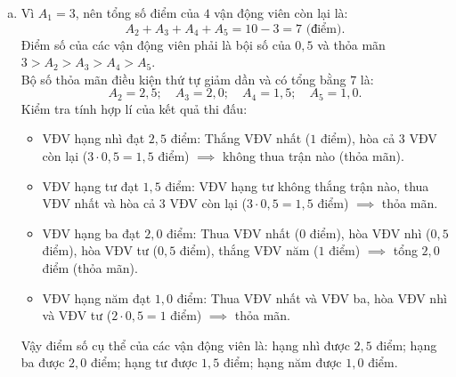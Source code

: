 \begin{bt}
{\begin{enumerate}[a)]
	Do đó vận động viên hạng nhất đạt được $3$ điểm ($3$ thắng, $1$ thua).
	\item Vì $A_1 = 3$, nên tổng số điểm của $4$ vận động viên còn lại là:
	$$A_2 + A_3 + A_4 + A_5 = 10 - 3 = 7\text{ (điểm)}.$$
	Điểm số của các vận động viên phải là bội số của $0{,}5$ và thỏa mãn $3 > A_2 > A_3 > A_4 > A_5$.\\
	Bộ số thỏa mãn điều kiện thứ tự giảm dần và có tổng bằng $7$ là:
	$$A_2 = 2{,}5; \quad A_3 = 2{,}0; \quad A_4 = 1{,}5; \quad A_5 = 1{,}0.$$
	Kiểm tra tính hợp lí của kết quả thi đấu:
	\begin{itemize}
		\item VĐV hạng nhì đạt $2{,}5$ điểm: Thắng VĐV nhất ($1$ điểm), hòa cả $3$ VĐV còn lại ($3 \cdot 0{,}5 = 1{,}5$ điểm) $\implies$ không thua trận nào (thỏa mãn).
		\item VĐV hạng tư đạt $1{,}5$ điểm: VĐV hạng tư không thắng trận nào, thua VĐV nhất và hòa cả $3$ VĐV còn lại ($3 \cdot 0{,}5 = 1{,}5$ điểm) $\implies$ thỏa mãn.
		\item VĐV hạng ba đạt $2{,}0$ điểm: Thua VĐV nhất ($0$ điểm), hòa VĐV nhì ($0{,}5$ điểm), hòa VĐV tư ($0{,}5$ điểm), thắng VĐV năm ($1$ điểm) $\implies$ tổng $2{,}0$ điểm (thỏa mãn).
		\item VĐV hạng năm đạt $1{,}0$ điểm: Thua VĐV nhất và VĐV ba, hòa VĐV nhì và VĐV tư ($2 \cdot 0{,}5 = 1$ điểm) $\implies$ thỏa mãn.
	\end{itemize}
	Vậy điểm số cụ thể của các vận động viên là: hạng nhì được $2{,}5$ điểm; hạng ba được $2{,}0$ điểm; hạng tư được $1{,}5$ điểm; hạng năm được $1{,}0$ điểm.
\end{enumerate}
}
\end{bt}

